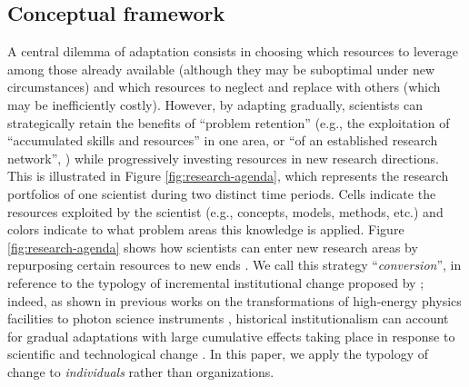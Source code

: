 \documentclass{article}
\begin{document}
\subsection{\label{sec:conceptual}Conceptual framework}

A central dilemma of adaptation consists in choosing which  resources to leverage among those already available (although they may be suboptimal under new circumstances) and which resources to neglect and replace with others (which may be inefficiently costly). 
However, by adapting gradually, scientists can strategically retain  the benefits of ``problem retention'' (e.g., the exploitation of ``accumulated skills and resources'' in one area, or ``of an established research network'', \citealt[p.~106]{Gieryn1978}) while progressively investing resources in new research directions. %
This is illustrated in Figure \ref{fig:research-agenda}, %
which represents the research portfolios of one scientist during two distinct time periods. Cells indicate the resources exploited by the scientist (e.g., concepts, models, methods, etc.) and colors indicate to what problem areas this knowledge is applied.
Figure \ref{fig:research-agenda} shows how scientists can enter new research areas by repurposing certain resources to new ends \citep{Mulkay1974,schon1963displacement}. We call this strategy ``\textit{conversion}'', in reference to the typology of incremental institutional change proposed by \citet{mahoney_thelen_2009}; indeed, as shown in previous works on the transformations of high-energy physics facilities to photon science instruments \citep{Hallonsten2013,hallonsten2015formation,Heinze2017a}, historical institutionalism can account for gradual adaptations with large cumulative effects taking place in response to scientific and technological change \citep{Heinze2012}. In this paper, we apply the typology of change to \textit{individuals} rather than organizations. 
\end{document}
